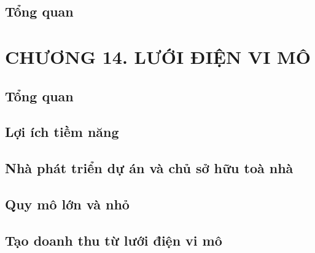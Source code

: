 \documentclass{thesis}
\begin{document}
\setcounter{section}{13}
\setcounter{subsection}{0}
\setcounter{figure}{0}
\setcounter{table}{0}

\subsection{Tổng quan}

\newpage
\section*{CHƯƠNG 14. LƯỚI ĐIỆN VI MÔ}
{}
\setcounter{section}{14}
\setcounter{figure}{0}
\setcounter{table}{0}
\setcounter{equation}{0}


\subsection{Tổng quan}

\subsection{Lợi ích tiềm năng}

\subsection{Nhà phát triển dự án và chủ sở hữu toà nhà}

\subsection{Quy mô lớn và nhỏ}

\subsection{Tạo doanh thu từ lưới điện vi mô}

\newpage
\end{document}
